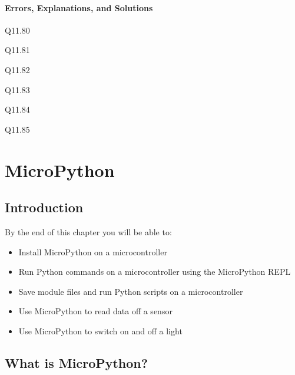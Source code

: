 \documentclass{book}
\begin{document}
    




    
        \subsubsection{Errors, Explanations, and
Solutions}\label{errors-explanations-and-solutions}

Q11.80

Q11.81

Q11.82

Q11.83

Q11.84

Q11.85
    




    
        \chapter{MicroPython}\label{micropython}
    




    
        \section{Introduction}\label{introduction}
    




    
        By the end of this chapter you will be able to:

\begin{itemize}
\item
  Install MicroPython on a microcontroller
\item
  Run Python commands on a microcontroller using the MicroPython REPL
\item
  Save module files and run Python scripts on a microcontroller
\item
  Use MicroPython to read data off a sensor
\item
  Use MicroPython to switch on and off a light
\end{itemize}
        \newpage



    




    
        \section{What is MicroPython?}\label{what-is-micropython}
    
\end{document}
